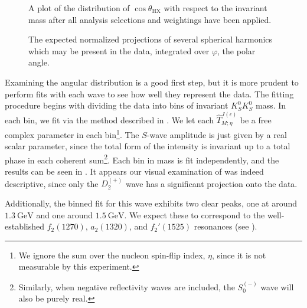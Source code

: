 \begin{figure}
  \begin{center}
    
  \end{center}
  \caption{A plot of the distribution of $\cos\theta_\text{HX}$ with respect to the invariant mass after all analysis selections and weightings have been applied.}\label{fig:costheta-vs-mass}
\end{figure}

\begin{figure}
  \begin{center}
    
  \end{center}
  \caption{The expected normalized projections of several spherical harmonics which may be present in the data, integrated over $\varphi$, the polar angle.}\label{fig:spherical-harmonics}
\end{figure}

Examining the angular distribution is a good first step, but it is more prudent to perform fits with each wave to see how well they represent the data. The fitting procedure begins with dividing the data into bins of invariant $K_S^0K_S^0$ mass. In each bin, we fit  via the method described in . We let each $\hat{T}_{M;\eta}^{J(\epsilon)}$ be a free complex parameter in each bin\footnote{We ignore the sum over the nucleon spin-flip index, $\eta$, since it is not measurable by this experiment.}. The $S$-wave amplitude is just given by a real scalar parameter, since the total form of the intensity is invariant up to a total phase in each coherent sum\footnote{Similarly, when negative reflectivity waves are included, the $S_0^{(-)}$ wave will also be purely real.}. Each bin in mass is fit independently, and the results can be seen in . It appears our visual examination of  was indeed descriptive, since only the $D_2^{(+)}$ wave has a significant projection onto the data.

Additionally, the binned fit for this wave exhibits two clear peaks, one at around $\SI{1.3}{\giga\electronvolt}$ and one around $\SI{1.5}{\giga\electronvolt}$. We expect these to correspond to the well-established $f_2(1270)$, $a_2(1320)$, and $f_2'(1525)$ resonances (see ). 


